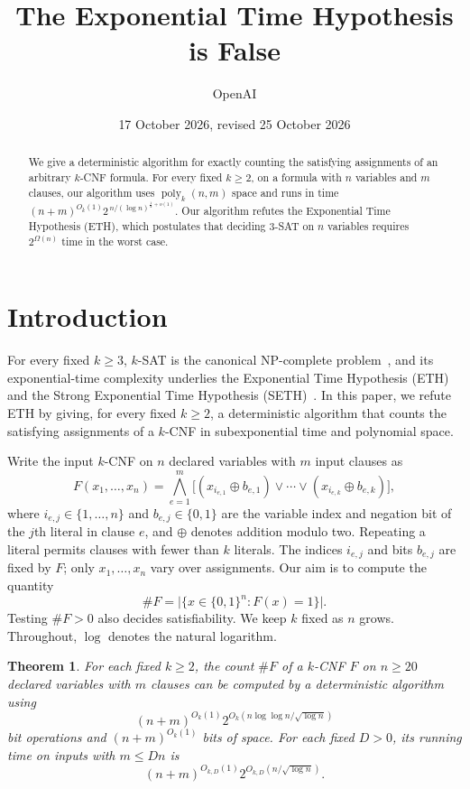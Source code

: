 \documentclass[11pt,reqno]{amsart}
\title{The Exponential Time Hypothesis is False}
\author{OpenAI}
\date{17 October 2026, revised 25 October 2026}
\numberwithin{equation}{section}
\newtheorem{theorem}{Theorem}[section]
\theoremstyle{definition}\newtheorem{definition}[theorem]{Definition}
\theoremstyle{remark}\newtheorem{remark}[theorem]{Remark}
\newcommand{\poly}{\operatorname{poly}}
\renewcommand{\le}{\leqslant}
\renewcommand{\ge}{\geqslant}
\begin{document}
\begin{abstract}
We give a deterministic algorithm for exactly counting the satisfying assignments
of an arbitrary $k$-CNF formula.
For every fixed $k\ge2$, on a formula with $n$ variables and $m$ clauses,
our algorithm uses $\poly_k(n,m)$ space and runs in time
$(n+m)^{O_k(1)}2^{\,n/(\log n)^{\frac12+o(1)}}$.
Our algorithm refutes the Exponential Time Hypothesis (ETH), which
postulates that deciding $3$-SAT on $n$ variables requires
$2^{\Omega(n)}$ time in the worst case.
\end{abstract}
\maketitle

\tableofcontents
\vspace{-\baselineskip}

\section{Introduction}
For every fixed $k\ge3$, $k$-SAT is the canonical NP-complete
problem~\cite{Cook71}, and its exponential-time complexity underlies the Exponential Time
Hypothesis (ETH) and the Strong Exponential Time Hypothesis
(SETH)~\cite{IP01,IPZ}.
In this paper, we refute ETH by giving, for every fixed $k\ge2$,
a deterministic algorithm that counts the satisfying assignments
of a $k$-CNF in subexponential time and polynomial space.

Write the input $k$-CNF on $n$ declared variables with $m$ input clauses as
\[
 F(x_1,\ldots,x_n)=\bigwedge_{e=1}^m
 \bigl[(x_{i_{e,1}}\oplus b_{e,1})\vee\cdots\vee
       (x_{i_{e,k}}\oplus b_{e,k})\bigr],
\]
where $i_{e,j}\in\{1,\ldots,n\}$ and $b_{e,j}\in\{0,1\}$ are the
variable index and negation bit of the $j$th literal in clause $e$,
and $\oplus$ denotes addition modulo two. Repeating a literal permits
clauses with fewer than $k$ literals.
The indices $i_{e,j}$ and bits $b_{e,j}$ are fixed by $F$;
only $x_1,\ldots,x_n$ vary over assignments.
Our aim is to compute the quantity
\begin{equation}\label{eq:solution-count}
 \#F=\bigl|\{x\in\{0,1\}^n:F(x)=1\}\bigr|.
\end{equation}
Testing $\#F>0$ also decides satisfiability.
We keep $k$ fixed as $n$ grows.
Throughout, $\log$ denotes the natural logarithm.
\begin{theorem}\label{thm:main}
For each fixed $k\ge2$, the count $\#F$ of a $k$-CNF $F$ on
$n\ge20$ declared variables with $m$ clauses can be computed by a
deterministic algorithm using
\[
 (n+m)^{O_k(1)}2^{O_k(n\log\log n/\sqrt{\log n})}
\]
bit operations and $(n+m)^{O_k(1)}$ bits of space.
For each fixed $D>0$, its running time on inputs with $m\le Dn$ is
\[
 (n+m)^{O_{k,D}(1)}2^{O_{k,D}(n/\sqrt{\log n})}.
\]
\end{theorem}
\end{document}

